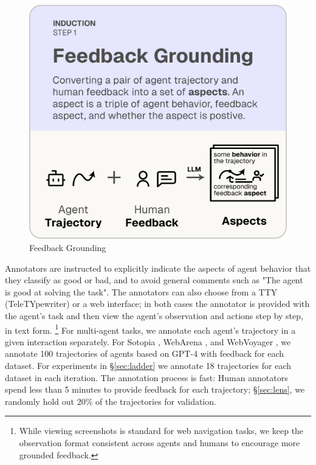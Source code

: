 \begin{figure}
	\vspace{-10pt}
	\includegraphics[width=\linewidth]{figs/autolibra_step_1.pdf}
	\vspace{-10pt}
	\caption{Feedback Grounding}
	\label{fig:feedback_grounding}
\end{figure}
Annotators are instructed to explicitly indicate the aspects of agent behavior
that they classify as good or bad, and to avoid general comments such as \textsf{"The
	agent is good at solving the task"}. The annotators can also choose from a TTY (TeleTYpewriter)
or a web interface; in both cases the annotator is provided with the agent's
task and then view the agent's observation and actions step by step, in text form.
\footnote{While viewing screenshots is standard for web navigation tasks, we keep
	the observation format consistent across agents and humans to encourage more grounded
	feedback.} For multi-agent tasks, we annotate each agent's trajectory in a given
interaction separately. For Sotopia \citep{zhousotopia}, WebArena \citep{zhouwebarena},
and WebVoyager \citep{he2024webvoyager}, we annotate 100 trajectories of agents
based on GPT-4 \citep{achiam2023gpt} with feedback for each dataset. For
experiments in \S\ref{sec:ladder} we annotate 18 trajectories for each dataset in
each iteration. The annotation process is fast: Human annotators spend less than
5 minutes to provide feedback for each trajectory; \S\ref{sec:lens}, we randomly
hold out 20\% of the trajectories for validation.

